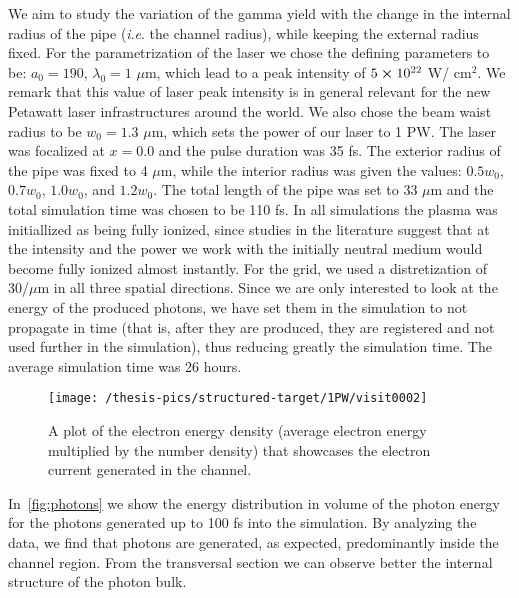 \documentclass[12pt, class=report, crop=false]{standalone}
\begin{document}
We aim to study the variation of the gamma yield
with the change in the internal radius of the pipe
(\textit{i}.\textit{e}. the channel radius), while keeping the
external radius fixed. For the parametrization of the laser we chose
the defining parameters to be: \(a_0 = 190\), \(\lambda_0 = 1\)
\(\mu\)m, which lead to a peak intensity of \(5\cp10^{22}\) W/
cm\(^{2}\). We remark that this value of laser peak intensity is in
general relevant for the new Petawatt laser infrastructures around
the world. We also chose the beam waist radius to be \(w_0 = 1.3\)
\(\mu\)m, which sets the power of our laser to 1 PW. The laser was
focalized at \(x = 0.0\) and the pulse duration was 35 fs. The
exterior radius of the pipe was fixed to 4 \(\mu\)m, while the
interior radius was given the values: \(0.5w_0\), \(0.7w_0\),
\(1.0w_0\), and \(1.2w_0\). The total length of the pipe was set to
33 \(\mu\)m and the total simulation time was chosen to be 110 fs.
In all simulations the plasma was initiallized as being fully
ionized, since studies in the literature suggest that at the
intensity and the power we work with the initially neutral medium
would become fully ionized almost instantly. For the grid,
we used a distretization of 30/\(\mu\)m in all three spatial
directions. Since we are only interested to look
at the energy of the produced photons, we have set them in the
simulation to not propagate in time (that is, after they are
produced, they are registered and not used further in the simulation),
thus reducing greatly the simulation time. The average simulation time
was 26 hours.

\begin{figure}[!h]
  \centering
  \texttt{[image: /thesis-pics/structured-target/1PW/visit0002]}%
  \caption{A plot of the electron energy density (average electron energy multiplied by the number density) that showcases the electron current generated in the channel.}
  \label{fig:electron-current}%
\end{figure}

In~\cref{fig:photons} we show the energy distribution in volume of the photon energy for the photons generated up to 100 fs into the simulation. By analyzing the data, we find that photons are generated, as expected, predominantly inside the channel region. From the transversal section we can observe better the internal structure of the photon bulk.
\end{document}
